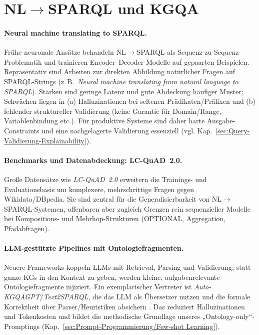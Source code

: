 \section{NL$\rightarrow$SPARQL und KGQA}
\label{sec:rw-nl2sparql}

\paragraph{Neural machine translating to SPARQL.}
Frühe neuronale Ansätze behandeln NL$\rightarrow$SPARQL als Sequenz-zu-Sequenz-Problematik und trainieren Encoder--Decoder-Modelle auf gepaarten Beispielen. Repräsentativ sind Arbeiten zur direkten Abbildung natürlicher Fragen auf SPARQL-Strings (z.\,B.\ \emph{Neural machine translating from natural language to SPARQL}). Stärken sind geringe Latenz und gute Abdeckung häufiger Muster; Schwächen liegen in (a) Halluzinationen bei seltenen Prädikaten/Präfixen und (b) fehlender struktureller Validierung (keine Garantie für Domain/Range, Variablenbindung etc.). Für produktive Systeme sind daher harte Ausgabe-Constraints und eine nachgelagerte Validierung essenziell (vgl. Kap.~\ref{sec:Query-Validierung-Explainability}).

\paragraph{Benchmarks und Datenabdeckung: LC-QuAD~2.0.}
Große Datensätze wie \emph{LC-QuAD~2.0} erweitern die Trainings- und Evaluationsbasis um komplexere, mehrschrittige Fragen gegen Wikidata/DBpedia. Sie sind zentral für die Generalisierbarkeit von NL$\rightarrow$SPARQL-Systemen, offenbaren aber zugleich Grenzen rein sequenzieller Modelle bei Kompositions- und Mehrhop-Strukturen (OPTIONAL, Aggregation, Pfadabfragen).

\paragraph{LLM-gestützte Pipelines mit Ontologiefragmenten.}
Neuere Frameworks koppeln LLMs mit Retrieval, Parsing und Validierung; statt ganze KGs in den Kontext zu geben, werden kleine, aufgabenrelevante Ontologiefragmente injiziert. Ein exemplarischer Vertreter ist \emph{Auto-KGQAGPT}/\emph{Text2SPARQL}, die das LLM als Übersetzer nutzen und die formale Korrektheit über Parser/Heuristiken absichern \cite{avila2024text2sparql}. Das reduziert Halluzinationen und Tokenkosten und bildet die methodische Grundlage unseres „Ontology-only“-Promptings (Kap.~\ref{sec:Prompt-Programmierung/Few-shot Learning}).

